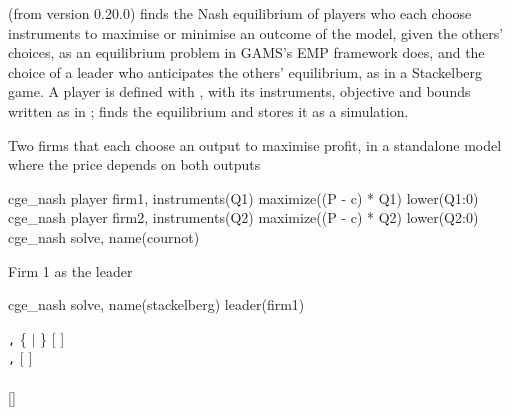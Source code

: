 

 (from version 0.20.0) finds the Nash equilibrium of players who
each choose instruments to maximise or minimise an outcome of the model,
given the others' choices, as an equilibrium problem in GAMS's EMP framework
does, and the choice of a leader who anticipates the others' equilibrium, as
in a Stackelberg game. A player is defined with , with
its instruments, objective and bounds written as in ;
 finds the equilibrium and stores it as a simulation.


Two firms that each choose an output to maximise profit, in a standalone
model where the price depends on both outputs
\begin{stcode}
cge_nash player firm1, instruments(Q1) maximize((P - c) * Q1) lower(Q1:0)
cge_nash player firm2, instruments(Q2) maximize((P - c) * Q2) lower(Q2:0)
cge_nash solve, name(cournot)
\end{stcode}
Firm 1 as the leader
\begin{stcode}
cge_nash solve, name(stackelberg) leader(firm1)
\end{stcode}


\begin{stsyntax}
  \texttt{,}  \{ $|$ \} [ ]\\
 \texttt{,}  [     ]\\
\\
 []
\end{stsyntax}

